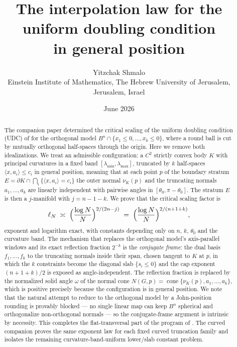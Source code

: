 \documentclass[11pt]{article}
\title{The interpolation law for the uniform doubling condition\\
in general position}
\author{Yitzchak Shmalo\\
\small Einstein Institute of Mathematics, The Hebrew University of Jerusalem, Jerusalem, Israel\\
\small }
\date{June 2026}
\theoremstyle{definition}
\theoremstyle{remark}
\newcommand{\cone}{\operatorname{cone}}
\newcommand{\nor}{\nu_K}
\begin{document}
\maketitle

\begin{abstract}
The companion paper \cite{companion11} determined the critical scaling of the
uniform doubling condition (UDC) of \cite{ShmaloUDC} for the orthogonal model
$B^n\cap\{x_1\le0,\dots,x_k\le0\}$, where a round ball is cut by mutually
orthogonal half-spaces through the origin.  Here we remove both idealizations.
We treat an admissible configuration: a $C^2$ strictly convex body $K$ with
principal curvatures in a fixed band $[\lambda_{\min},\lambda_{\max}]$,
truncated by $k$ half-spaces $\langle x,a_i\rangle\le c_i$ in general
position, meaning that at each point $p$ of the boundary stratum
$E=\partial K\cap\bigcap_i\{\langle x,a_i\rangle=c_i\}$ the outer normal
$\nor(p)$ and the truncating normals $a_1,\dots,a_k$ are linearly independent
with pairwise angles in $[\theta_0,\pi-\theta_0]$.  The stratum $E$ is then a
$j$-manifold with $j=n-1-k$.  We prove that the critical scaling factor is
\[
\ell_N\;\asymp\;\Bigl(\frac{\log N}{N}\Bigr)^{2/(2n-j)}
\;=\;\Bigl(\frac{\log N}{N}\Bigr)^{2/(n+1+k)},
\]
exponent and logarithm exact, with constants depending only on $n$, $k$,
$\theta_0$ and the curvature band.  The mechanism that replaces the
orthogonal model's axis-parallel windows and its exact reflection fraction
$2^{-k}$ is the \emph{conjugate frame}: the dual basis $f_1,\dots,f_k$ to the
truncating normals inside their span, chosen tangent to $K$ at $p$, in which
the $k$ constraints become the diagonal slab $\{s_i\le0\}$ and the cap
exponent $(n+1+k)/2$ is exposed as angle-independent.  The reflection fraction
is replaced by the normalized solid angle $\omega$ of the normal cone
$N(G,p)=\cone\{\nor(p),a_1,\dots,a_k\}$, which is positive precisely because
the configuration is in general position.  We note that the natural
attempt to reduce to the orthogonal model by a John-position rounding is
provably blocked --- no single linear map can keep $B^n$ spherical and
orthogonalize non-orthogonal normals --- so the conjugate-frame argument is
intrinsic by necessity.  This completes the flat-transversal part of the program
of \cite{companion11,companion6,companion7}.  The curved companion
\cite{companion15curved} proves the same exponent law for each fixed curved
truncation family and isolates the remaining curvature-band-uniform lower/slab
constant problem.
\end{abstract}
\end{document}
